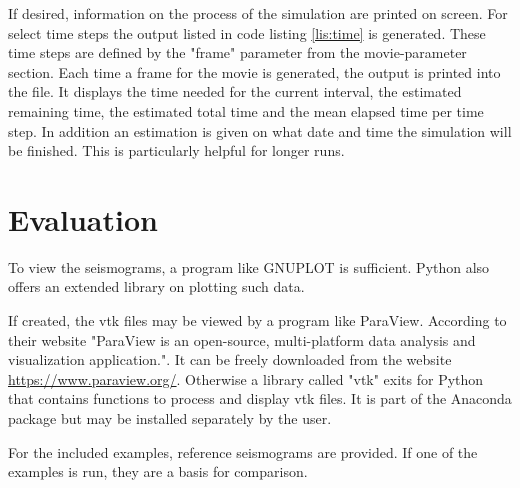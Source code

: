 		If desired, information on the process of the simulation are printed on screen. For select time steps the output listed in code listing \ref{lis:time} is generated. These time steps are defined by the "frame" parameter from the movie-parameter section. Each time a frame for the movie is generated, the output is printed into the file.
		It displays the time needed for the current interval, the estimated remaining time, the estimated total time and the mean elapsed time per time step. In addition an estimation is given on what date and time the simulation will be finished. This is particularly helpful for longer runs. 
		
		
    	
    \section{Evaluation}
    \label{sec:eval}
    	To view the seismograms, a program like GNUPLOT is sufficient. Python also offers an extended library on plotting such data.
    	
    	If created, the vtk files may be viewed by a program like ParaView. According to their website "ParaView is an open-source, multi-platform data analysis and visualization application.". It can be freely downloaded from the website \url{https://www.paraview.org/}. Otherwise a library called "vtk" exits for Python that contains functions to process and display vtk files. It is part of the Anaconda package but may be installed separately by the user.
    	
    	For the included examples, reference seismograms are provided. If one of the examples is run, they are a basis for comparison.